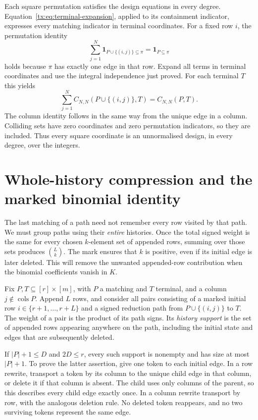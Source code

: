 Each square permutation satisfies the design equations in every degree.
Equation~\eqref{tx:eq:terminal-expansion}, applied to its containment
indicator, expresses every matching indicator in terminal coordinates.
For a fixed row $i$, the permutation identity
\[
 \sum_{j=1}^{N}\boldsymbol{1}_{P\cup\{(i,j)\}\subseteq\pi}
       =\boldsymbol{1}_{P\subseteq\pi}
\]
holds because $\pi$ has exactly one edge in that row.  Expand all terms
in terminal coordinates and use the integral independence just proved.
For each terminal $T$ this yields
\[
 \sum_{j=1}^{N}C_{N,N}(P\cup\{(i,j)\},T)=C_{N,N}(P,T).
\]
The column identity follows in the same way from the unique edge in a
column.  Colliding sets have zero coordinates and zero permutation
indicators, so they are included.  Thus every square coordinate is an
unnormalised design, in every degree, over the integers.

\section{Whole-history compression and the marked binomial identity}
The last matching of a path need not remember every row visited by
that path. We must group paths using their \emph{entire} histories.
Once the total signed weight is the same for every chosen $k$-element set
of appended rows, summing over those sets produces $\binom{L}{k}$.
The mark ensures that $k$ is positive, even if its initial edge is
later deleted. This will remove the unwanted appended-row contribution
when the binomial coefficients vanish in $K$.


Fix $P,T\subseteq[r]\times[m]$, with $P$ a matching and $T$ terminal, and a column
$j\notin\operatorname{cols}P$.  Append $L$ rows, and consider all pairs
consisting of a marked initial row $i\in\{r+1,\ldots,r+L\}$ and a signed
reduction path from $P\cup\{(i,j)\}$ to $T$.  The weight of a pair is the
product of its path signs.  Its \emph{history support} is the set of
appended rows appearing anywhere on the path, including the initial
state and edges that are subsequently deleted.

If $|P|+1\leq D$ and $2D\leq r$, every such support is nonempty and has
size at most $|P|+1$.  To prove the latter assertion, give one token to
each initial edge.  In a row rewrite, transport a token by its column
to the unique child edge in that column, or delete it if that column
is absent.  The child uses only columns of the parent, so this describes
every child edge exactly once.  In a column rewrite transport by row,
with the analogous deletion rule.  No deleted token reappears, and no
two surviving tokens represent the same edge.

